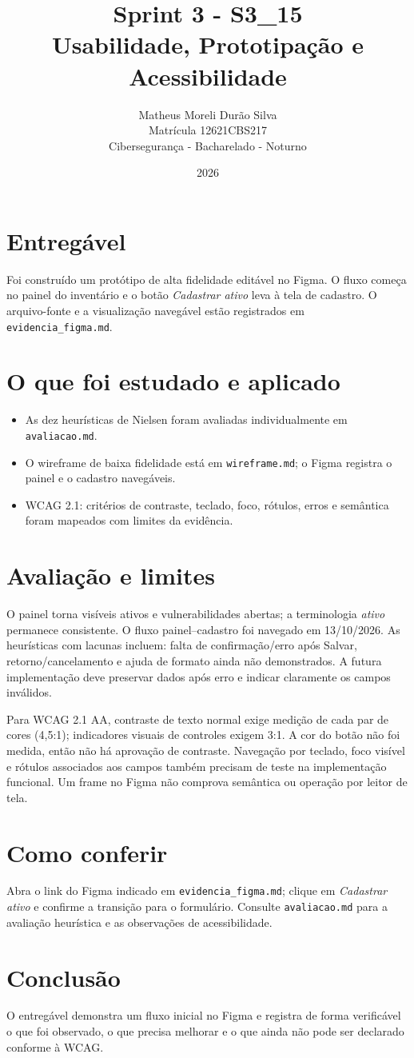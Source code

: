 \documentclass[12pt]{article}
\title{Sprint 3 - S3\_15\\Usabilidade, Prototipação e Acessibilidade}
\author{Matheus Moreli Durão Silva\\Matrícula 12621CBS217\\Cibersegurança - Bacharelado - Noturno}
\date{2026}
\begin{document}
\maketitle

\section*{Entregável}
Foi construído um protótipo de alta fidelidade editável no Figma. O fluxo começa no painel do inventário e o botão \textit{Cadastrar ativo} leva à tela de cadastro. O arquivo-fonte e a visualização navegável estão registrados em \texttt{evidencia\_figma.md}.

\section*{O que foi estudado e aplicado}
\begin{itemize}
\item As dez heurísticas de Nielsen foram avaliadas individualmente em \texttt{avaliacao.md}.
\item O wireframe de baixa fidelidade está em \texttt{wireframe.md}; o Figma registra o painel e o cadastro navegáveis.
\item WCAG 2.1: critérios de contraste, teclado, foco, rótulos, erros e semântica foram mapeados com limites da evidência.
\end{itemize}

\section*{Avaliação e limites}
O painel torna visíveis ativos e vulnerabilidades abertas; a terminologia \textit{ativo} permanece consistente. O fluxo painel--cadastro foi navegado em 13/10/2026. As heurísticas com lacunas incluem: falta de confirmação/erro após Salvar, retorno/cancelamento e ajuda de formato ainda não demonstrados. A futura implementação deve preservar dados após erro e indicar claramente os campos inválidos.

Para WCAG 2.1 AA, contraste de texto normal exige medição de cada par de cores (4,5:1); indicadores visuais de controles exigem 3:1. A cor do botão não foi medida, então não há aprovação de contraste. Navegação por teclado, foco visível e rótulos associados aos campos também precisam de teste na implementação funcional. Um frame no Figma não comprova semântica ou operação por leitor de tela.

\section*{Como conferir}
Abra o link do Figma indicado em \texttt{evidencia\_figma.md}; clique em \textit{Cadastrar ativo} e confirme a transição para o formulário. Consulte \texttt{avaliacao.md} para a avaliação heurística e as observações de acessibilidade.

\section*{Conclusão}
O entregável demonstra um fluxo inicial no Figma e registra de forma verificável o que foi observado, o que precisa melhorar e o que ainda não pode ser declarado conforme à WCAG.
\end{document}
